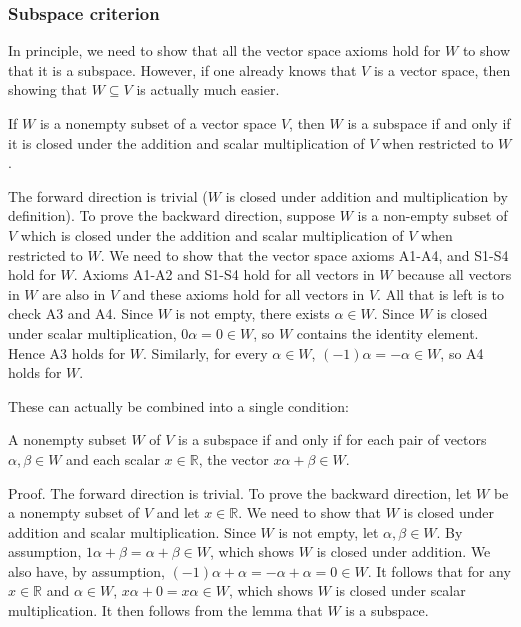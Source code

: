 \documentclass[12pt,letterpaper,reqno]{article}
\numberwithin{equation}{section}
\begin{document}
\subsubsection{Subspace criterion}
In principle, we need to show that all the vector space axioms hold for $W$ to show that it is a subspace. However, if one already knows that $V$ is a vector space, then showing that $W \subseteq V$ is actually much easier.

\begin{lem}\label{lem:subspace_criterion}
	If $W$ is a nonempty subset of a vector space $V$, then $W$ is a subspace if and only if it is closed under the addition and scalar multiplication of $V$ when restricted to $W$.
\end{lem}

\begin{pf}
The forward direction is trivial ($W$ is closed under addition and multiplication by definition). To prove the backward direction, suppose $W$ is a non-empty subset of $V$ which is closed under the addition and scalar multiplication of $V$ when restricted to $W$. We need to show that the vector space axioms A1-A4, and S1-S4 hold for $W$. Axioms A1-A2 and S1-S4 hold for all vectors in $W$ because all vectors in $W$ are also in $V$ and these axioms hold for all vectors in $V$. All that is left is to check A3 and A4. Since $W$ is not empty, there exists $\alpha \in W$. Since $W$ is closed under scalar multiplication, $0\alpha=0 \in W$, so $W$ contains the identity element. Hence A3 holds for $W$. Similarly, for every $\alpha \in W$, $(-1)\alpha=-\alpha \in W$, so A4 holds for $W$.	
\end{pf}

These can actually be combined into a single condition:

\begin{thm}
A nonempty subset $W$ of $V$ is a subspace if and only if for each pair of vectors $\alpha,\beta \in W$ and each scalar $x \in \mathbb{R}$, the vector $x\alpha+\beta \in W$.	
\end{thm}

\begin{pf}
Proof. The forward direction is trivial. To prove the backward direction, let $W$ be a nonempty subset of $V$ and let $x \in \mathbb{R}$. We need to show that $W$ is closed under addition and scalar multiplication. Since $W$ is not empty, let $\alpha, \beta \in W$. By assumption, $1\alpha+\beta=\alpha+\beta \in W$, which shows $W$ is closed under addition. We also have, by assumption, $(-1)\alpha+\alpha=-\alpha+\alpha=0 \in W$. It follows that for any $x \in \mathbb{R}$ and $\alpha \in W$, $x\alpha+0=x\alpha \in W$, which shows $W$ is closed under scalar multiplication. It then follows from the lemma that $W$ is a subspace.	
\end{pf}
\end{document}
